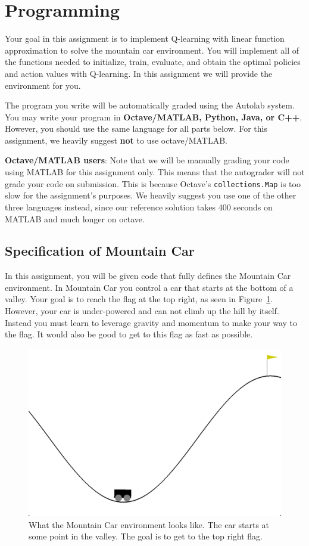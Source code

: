 \section{Programming }
\label{sec:code}

Your goal in this assignment is to implement Q-learning with linear function approximation to solve the mountain car environment. You will implement all of the functions needed to initialize, train, evaluate, and obtain the optimal policies and action values with Q-learning. In this assignment we will provide the environment for you.

The program you write will be automatically graded using the Autolab system. You may write your program in \textbf{Octave/MATLAB, Python, Java, or C++}. However, you should use the same language for all parts below. For this assignment, we heavily suggest \textbf{not} to use octave/MATLAB.

\textbf{Octave/MATLAB users}: Note that we will be manually grading your code using MATLAB for this assignment only. This means that the autograder will not grade your code on submission. This is because Octave's \texttt{collections.Map} is too slow for the assignment's purposes. We heavily suggest you use one of the other three languages instead, since our reference solution takes 400 seconds on MATLAB and much longer on octave.

\subsection{Specification of Mountain Car}
In this assignment, you will be given code that fully defines the Mountain Car environment. In Mountain Car you control a car that starts at the bottom of a valley. Your goal is to reach the flag at the top right, as seen in Figure~\ref{fig:mountaincar}. However, your car is under-powered and can not climb up the hill by itself. Instead you must learn to leverage gravity and momentum to make your way to the flag. It would also be good to get to this flag as fast as possible.

\begin{figure}[H]
    \centering
    \includegraphics[width=0.5\linewidth]{figs/MountainCar.png}
    \caption{What the Mountain Car environment looks like. The car starts at some point in the valley. The goal is to get to the top right flag.}
    \label{fig:mountaincar}
\end{figure}

